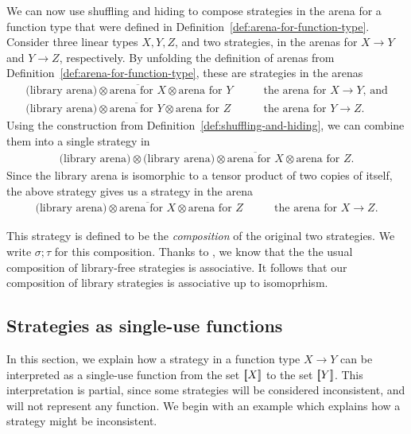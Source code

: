 We can now use shuffling and hiding to compose strategies in the arena for a function type that were defined in Definition~\ref{def:arena-for-function-type}.
Consider three linear types $X, Y, Z$, and two strategies, in the arenas for $X \to Y$ and $Y \to Z$, respectively.
 By unfolding the definition of arenas from Definition~\ref{def:arena-for-function-type}, these are strategies in the arenas 
\begin{align*}
\text{(library arena)} \otimes \overline{\text{arena for $X$}} \otimes \text{arena for $Y$} & \qquad \text{the arena for $X \to Y$, and}
\\
\text{(library arena)} \otimes \overline{\text{arena for $Y$}} \otimes \text{arena for $Z$} & \qquad \text{the arena for $Y \to Z$}.
\end{align*}
Using the construction from Definition~\ref{def:shuffling-and-hiding}, we can combine them into a single  strategy in 
\begin{align*}
\text{(library arena)} \otimes  \text{(library arena)}\otimes \overline{\text{arena for $X$}} \otimes \text{arena for $Z$}.
\end{align*}
Since the library arena is isomorphic to a tensor product of two copies of itself, the above strategy gives us a strategy in the arena 
\begin{align*}
    \text{(library arena)} \otimes   \overline{\text{arena for $X$}} \otimes \text{arena for $Z$} & \qquad \text{the arena for $X \to Z$.}
    \end{align*}

This strategy is defined to be the \emph{composition} of the original two  strategies. We write $\sigma; \tau$ for this composition. Thanks to \cite[Proposition~1.2]{abramsky2013semantics}, we know that the the usual
composition of library-free strategies is associative. It follows that our composition of library strategies is associative 
up to isomoprhism. 


\subsection{Strategies as single-use functions}
In this section, we explain how a strategy in a function type $X \to Y$ can be interpreted as a single-use function from the set  $[{\kern-0.45ex}[X]{\kern-0.45ex}]$ to the set $[{\kern-0.45ex}[Y]{\kern-0.45ex}]$. This interpretation is partial, since some strategies will be considered inconsistent, and will not represent any function. We begin with an example which explains how  a strategy might be inconsistent. 


